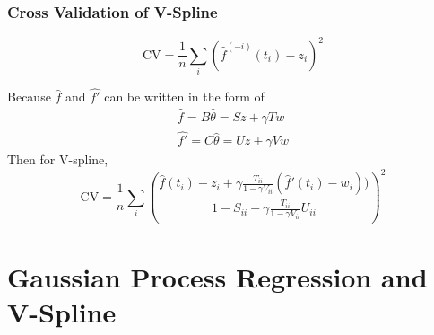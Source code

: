 \documentclass{beamer}
\begin{document}
\begin{frame}
\frametitle{Cross Validation of V-Spline}
\begin{equation}
\mbox{CV}=\frac{1}{n}\sum_i (\hat{f}^{(-i)}(t_i)-z_i)^2
\end{equation}

Because $\hat{f}$ and $\hat{f'}$ can be written in the form of
\begin{align*}
\hat{f}=B\hat{\theta}=Sz+\gamma Tw\\
\hat{f'}=C\hat{\theta}=Uz+\gamma Vw
\end{align*}
Then for V-spline, 
\begin{equation}
\mbox{CV}=\frac{1}{n}\sum_i \left(\frac{\hat{f}(t_i)-z_i+\gamma \frac{T_{ii}}{1-\gamma V_{ii}}(\hat{f}'(t_i)-w_i)) }{1-S_{ii}-\gamma \frac{T_{ii}}{1-\gamma V_{ii}}U_{ii}}\right)^2
\end{equation}
\end{frame}



\section{Gaussian Process Regression and V-Spline}
\end{document}
